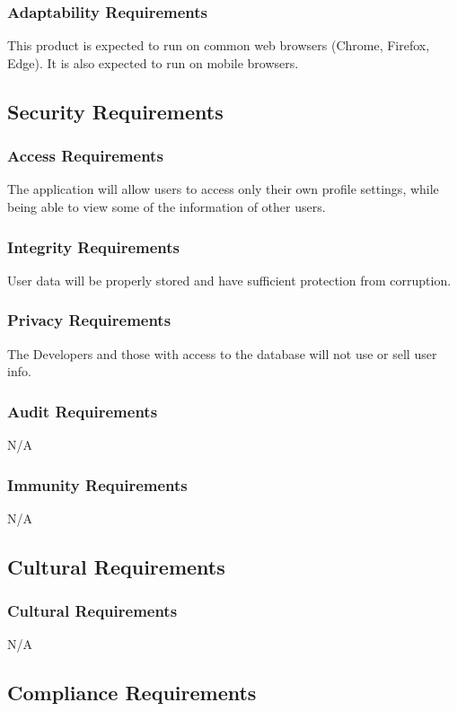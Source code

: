 \documentclass[12pt]{article}
\begin{document}
\subsubsection{Adaptability Requirements}
This product is expected to run on common web browsers (Chrome, Firefox, Edge). It is also expected to run on mobile browsers.

\subsection{Security Requirements}


\subsubsection{Access Requirements}
The application will allow users to access only their own profile settings, while being able to view some of the information of other users.

\subsubsection{Integrity Requirements}
User data will be properly stored and have sufficient protection from corruption.
\subsubsection{Privacy Requirements}
The Developers and those with access to the database will not use or sell user info.

\subsubsection{Audit Requirements}
N/A

\subsubsection{Immunity Requirements}
N/A

\subsection{Cultural Requirements}

\subsubsection{Cultural Requirements}
N/A
\subsection{Compliance Requirements}
\end{document}
